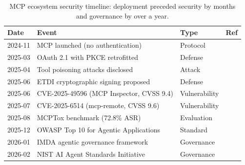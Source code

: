
\begin{table}[htbp]
\centering
\caption{MCP ecosystem security timeline: deployment preceded security by months and governance by over a year.}
\label{tab:mcp-timeline}

\fontsize{7}{9}\selectfont
\setlength{\tabcolsep}{5pt}
\renewcommand{\arraystretch}{1.3}

\begin{tabular}{l l l l}
\toprule
\textbf{Date} & \textbf{Event} & \textbf{Type} & \textbf{Ref} \\
\midrule

\rowcolor{rowgray}
2024-11 & MCP launched (no authentication) & Protocol & \cite{anthropic2024mcp} \\
2025-03 & OAuth 2.1 with PKCE retrofitted & Defense & \cite{mcpspec2025} \\
\rowcolor{rowgray}
2025-04 & Tool poisoning attacks disclosed & Attack & \cite{invariant2025toolpoisoning} \\
2025-06 & ETDI cryptographic signing proposed & Defense & \cite{bhatt2025etdi} \\
\rowcolor{rowgray}
2025-06 & CVE-2025-49596 (MCP Inspector, CVSS 9.4) & Vulnerability & \cite{oligo2025inspector} \\
2025-07 & CVE-2025-6514 (mcp-remote, CVSS 9.6) & Vulnerability & \cite{jfrog2025mcpremote} \\
\rowcolor{rowgray}
2025-08 & MCPTox benchmark (72.8\% ASR) & Evaluation & \cite{wang2025mcptox} \\
2025-12 & OWASP Top 10 for Agentic Applications & Standard & \cite{owasp2025agentic} \\
\rowcolor{rowgray}
2026-01 & IMDA agentic governance framework & Governance & \cite{imda2026agentic} \\
2026-02 & NIST AI Agent Standards Initiative & Governance & \cite{nist2026agentstandards} \\

\bottomrule
\end{tabular}
\end{table}
